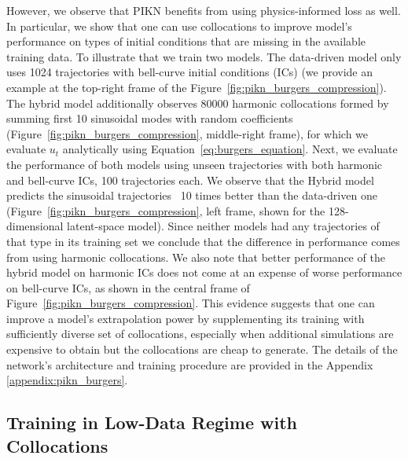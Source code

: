     However, we observe that PIKN benefits from using physics-informed loss as well. In particular, we show that one can use collocations to improve model's performance on types of initial conditions that are missing in the available training data. To illustrate that we train two models. The data-driven model only uses 1024 trajectories with bell-curve initial conditions (ICs) (we provide an example at the top-right frame of the Figure~\ref{fig:pikn_burgers_compression}). The hybrid model additionally observes 80000 harmonic collocations formed by summing first 10 sinusoidal modes with random coefficients (Figure~\ref{fig:pikn_burgers_compression}, middle-right frame), for which we evaluate $u_t$ analytically using Equation~\ref{eq:burgers_equation}. Next, we evaluate the performance of both models using unseen trajectories with both harmonic and bell-curve ICs, 100 trajectories each. We observe that the Hybrid model predicts the sinusoidal trajectories ~10 times better than the data-driven one (Figure~\ref{fig:pikn_burgers_compression}, left frame, shown for the 128-dimensional latent-space model). Since neither models had any trajectories of that type in its training set we conclude that the difference in performance comes from using harmonic collocations. We also note that better performance of the hybrid model on harmonic ICs does not come at an expense of worse performance on bell-curve ICs, as shown in the central frame of Figure~\ref{fig:pikn_burgers_compression}. This evidence suggests that one can improve a model's extrapolation power  by supplementing its training with sufficiently diverse set of collocations, especially when additional simulations are expensive to obtain but the collocations are cheap to generate. The details of the network's architecture and training procedure are provided in the Appendix \ref{appendix:pikn_burgers}.

    

\subsection{Training in Low-Data Regime with Collocations}
\label{sec:data_vs_collocations}

